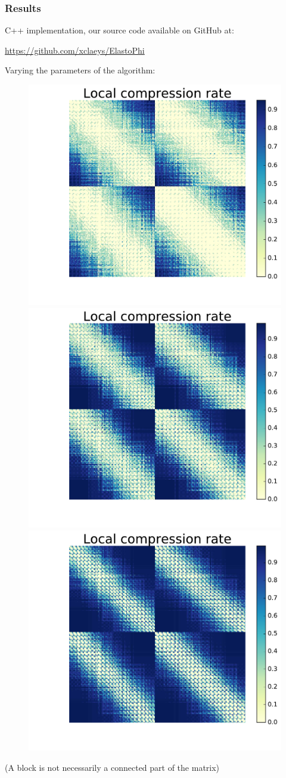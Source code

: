 
\begin{frame}
\frametitle{Results}

C++ implementation, our source code available on GitHub at:
\begin{center}
\url{https://github.com/xclaeys/ElastoPhi}
\end{center}

Varying the parameters of the algorithm:
\vspace{-5pt}
\begin{figure}
\centering
\includegraphics[width=.33\textwidth]{../images/graphe_mapp_output_local_comp_1_0,9_matrice450Fracs.pdf}
\includegraphics[width=.33\textwidth]{../images/graphe_mapp_output_local_comp_10_0,9_matrice450Fracs.pdf}
\includegraphics[width=.33\textwidth]{../images/graphe_mapp_output_local_comp_10_1_matrice450Fracs.pdf}
\end{figure}

(A block is not necessarily a connected part of the matrix)
\end{frame}


